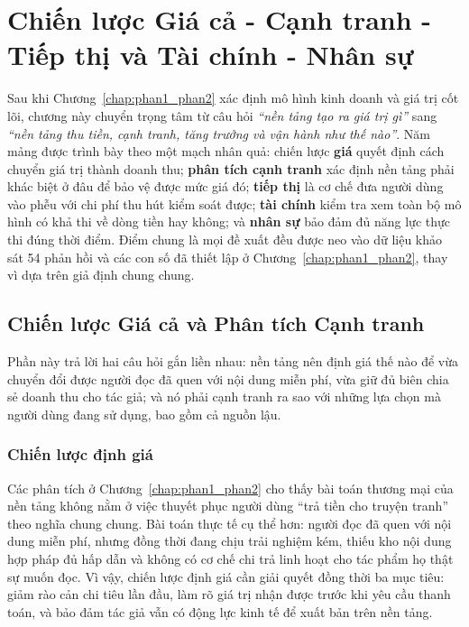 \chapter{Chiến lược Giá cả - Cạnh tranh - Tiếp thị và Tài chính - Nhân sự}
\label{chap:phan3}

Sau khi Chương~\ref{chap:phan1_phan2} xác định mô hình kinh doanh và giá trị cốt lõi, chương này chuyển trọng tâm từ câu hỏi \textit{``nền tảng tạo ra giá trị gì''} sang \textit{``nền tảng thu tiền, cạnh tranh, tăng trưởng và vận hành như thế nào''}. Năm mảng được trình bày theo một mạch nhân quả: chiến lược \textbf{giá} quyết định cách chuyển giá trị thành doanh thu; \textbf{phân tích cạnh tranh} xác định nền tảng phải khác biệt ở đâu để bảo vệ được mức giá đó; \textbf{tiếp thị} là cơ chế đưa người dùng vào phễu với chi phí thu hút kiểm soát được; \textbf{tài chính} kiểm tra xem toàn bộ mô hình có khả thi về dòng tiền hay không; và \textbf{nhân sự} bảo đảm đủ năng lực thực thi đúng thời điểm. Điểm chung là mọi đề xuất đều được neo vào dữ liệu khảo sát 54 phản hồi và các con số đã thiết lập ở Chương~\ref{chap:phan1_phan2}, thay vì dựa trên giả định chung chung.

\section{Chiến lược Giá cả và Phân tích Cạnh tranh}

Phần này trả lời hai câu hỏi gắn liền nhau: nền tảng nên định giá thế nào để vừa chuyển đổi được người đọc đã quen với nội dung miễn phí, vừa giữ đủ biên chia sẻ doanh thu cho tác giả; và nó phải cạnh tranh ra sao với những lựa chọn mà người dùng đang sử dụng, bao gồm cả nguồn lậu.

\subsection{Chiến lược định giá}

Các phân tích ở Chương~\ref{chap:phan1_phan2} cho thấy bài toán thương mại của nền tảng không nằm ở việc thuyết phục người dùng ``trả tiền cho truyện tranh'' theo nghĩa chung chung. Bài toán thực tế cụ thể hơn: người đọc đã quen với nội dung miễn phí, nhưng đồng thời đang chịu trải nghiệm kém, thiếu kho nội dung hợp pháp đủ hấp dẫn và không có cơ chế chi trả linh hoạt cho tác phẩm họ thật sự muốn đọc. Vì vậy, chiến lược định giá cần giải quyết đồng thời ba mục tiêu: giảm rào cản chi tiêu lần đầu, làm rõ giá trị nhận được trước khi yêu cầu thanh toán, và bảo đảm tác giả vẫn có động lực kinh tế để xuất bản trên nền tảng.

